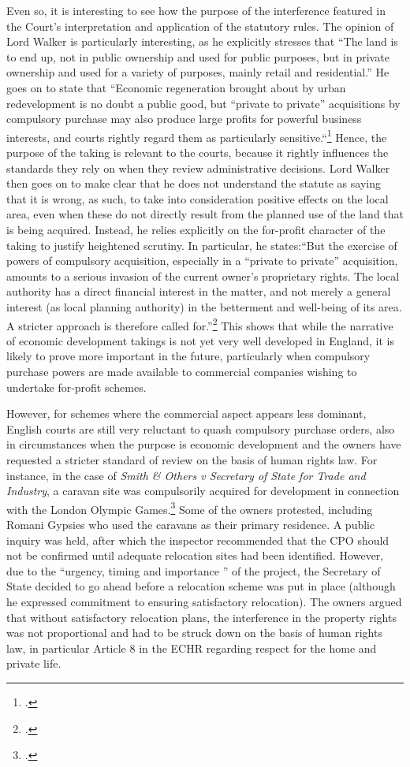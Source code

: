 Even so, it is interesting to see how the purpose of the interference featured in the Court's interpretation and application of the statutory rules. The opinion of Lord Walker is particularly interesting, as he explicitly stresses that ``The land is to end up, not in public ownership and used for public purposes, but in private ownership and used for a variety of purposes, mainly retail and residential.'' He goes on to state that ``Economic regeneration brought about by urban redevelopment is no doubt a public good, but ``private to private'' acquisitions by compulsory purchase may also produce large profits for powerful business interests, and courts rightly regard them as particularly sensitive.``\footcite[81]{sainsbury10} Hence, the purpose of the taking is relevant to the courts, because it rightly influences the standards they rely on when they review administrative decisions. Lord Walker then goes on to make clear that he does not understand the statute as saying that it is wrong, as such, to take into consideration positive effects on the local area, even when these do not directly result from the planned use of the land that is being acquired. Instead, he relies explicitly on the for-profit character of the taking to justify heightened scrutiny. In particular, he states:``But the exercise of powers of compulsory acquisition, especially in a ``private to private'' acquisition, amounts to a serious invasion of the current owner's proprietary rights. The local authority has a direct financial interest in the matter, and not merely a general interest (as local planning authority) in the betterment and well-being of its area. A stricter approach is therefore called for.''\footcite[84]{sainsbury10} This shows that while the narrative of economic development takings is not yet very well developed in England, it is likely to prove more important in the future, particularly when compulsory purchase powers are made available to commercial companies wishing to undertake for-profit schemes. 

However, for schemes where the commercial aspect appears less dominant, English courts are still very reluctant to quash compulsory purchase orders, also in circumstances when the purpose is economic development and the owners have requested a stricter standard of review on the basis of human rights law. For instance, in the case of {\it Smith \& Others v Secretary of State for Trade and Industry}, a caravan site was compulsorily acquired for development in connection with the London Olympic Games.\footcite{smith08} Some of the owners protested, including Romani Gypsies who used the caravans as their primary residence. A public inquiry was held, after which the inspector recommended that the CPO should not be confirmed until adequate relocation sites had been identified. However, due to the ``urgency, timing and importance '' of the project, the Secretary of State decided to go ahead before a relocation scheme was put in place (although he expressed commitment to ensuring satisfactory relocation). The owners argued that without satisfactory relocation plans, the interference in the property rights was not proportional and had to be struck down on the basis of human rights law, in particular Article 8 in the ECHR regarding respect for the home and private life.


